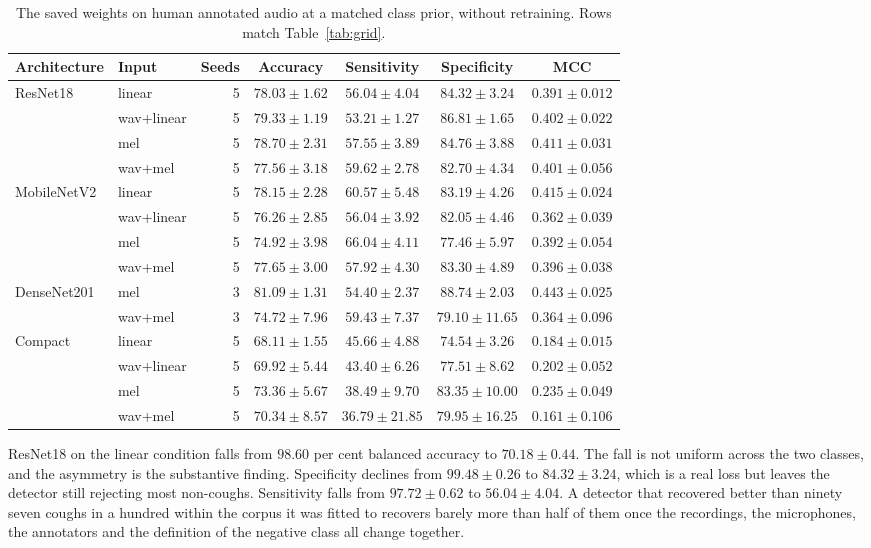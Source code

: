 \documentclass[pdflatex,sn-mathphys-num]{sn-jnl}
\begin{document}
\begin{table}[tbp]
\caption{The saved weights on human annotated audio at a matched class prior, without retraining. Rows match Table~\ref{tab:grid}.}\label{tab:external}
\small
\begin{tabular}{@{}llrcccc@{}}
\toprule
Architecture & Input & Seeds & Accuracy & Sensitivity & Specificity & MCC \\
\midrule
ResNet18 & linear & 5 & $78.03 \pm 1.62$ & $56.04 \pm 4.04$ & $84.32 \pm 3.24$ & $0.391 \pm 0.012$ \\
 & wav+linear & 5 & $79.33 \pm 1.19$ & $53.21 \pm 1.27$ & $86.81 \pm 1.65$ & $0.402 \pm 0.022$ \\
 & mel & 5 & $78.70 \pm 2.31$ & $57.55 \pm 3.89$ & $84.76 \pm 3.88$ & $0.411 \pm 0.031$ \\
 & wav+mel & 5 & $77.56 \pm 3.18$ & $59.62 \pm 2.78$ & $82.70 \pm 4.34$ & $0.401 \pm 0.056$ \\
\addlinespace
MobileNetV2 & linear & 5 & $78.15 \pm 2.28$ & $60.57 \pm 5.48$ & $83.19 \pm 4.26$ & $0.415 \pm 0.024$ \\
 & wav+linear & 5 & $76.26 \pm 2.85$ & $56.04 \pm 3.92$ & $82.05 \pm 4.46$ & $0.362 \pm 0.039$ \\
 & mel & 5 & $74.92 \pm 3.98$ & $66.04 \pm 4.11$ & $77.46 \pm 5.97$ & $0.392 \pm 0.054$ \\
 & wav+mel & 5 & $77.65 \pm 3.00$ & $57.92 \pm 4.30$ & $83.30 \pm 4.89$ & $0.396 \pm 0.038$ \\
\addlinespace
DenseNet201 & mel & 3 & $81.09 \pm 1.31$ & $54.40 \pm 2.37$ & $88.74 \pm 2.03$ & $0.443 \pm 0.025$ \\
 & wav+mel & 3 & $74.72 \pm 7.96$ & $59.43 \pm 7.37$ & $79.10 \pm 11.65$ & $0.364 \pm 0.096$ \\
\addlinespace
Compact & linear & 5 & $68.11 \pm 1.55$ & $45.66 \pm 4.88$ & $74.54 \pm 3.26$ & $0.184 \pm 0.015$ \\
 & wav+linear & 5 & $69.92 \pm 5.44$ & $43.40 \pm 6.26$ & $77.51 \pm 8.62$ & $0.202 \pm 0.052$ \\
 & mel & 5 & $73.36 \pm 5.67$ & $38.49 \pm 9.70$ & $83.35 \pm 10.00$ & $0.235 \pm 0.049$ \\
 & wav+mel & 5 & $70.34 \pm 8.57$ & $36.79 \pm 21.85$ & $79.95 \pm 16.25$ & $0.161 \pm 0.106$ \\
\bottomrule
\end{tabular}
\end{table}

ResNet18 on the linear condition falls from $98.60$ per cent balanced accuracy to
$70.18 \pm 0.44$. The fall is not uniform across the two classes, and the asymmetry is the
substantive finding. Specificity declines from $99.48 \pm 0.26$ to $84.32 \pm 3.24$, which
is a real loss but leaves the detector still rejecting most non-coughs. Sensitivity falls
from $97.72 \pm 0.62$ to $56.04 \pm 4.04$. A detector that recovered better than ninety
seven coughs in a hundred within the corpus it was fitted to recovers barely more than
half of them once the recordings, the microphones, the annotators and the definition of
the negative class all change together.
\end{document}
